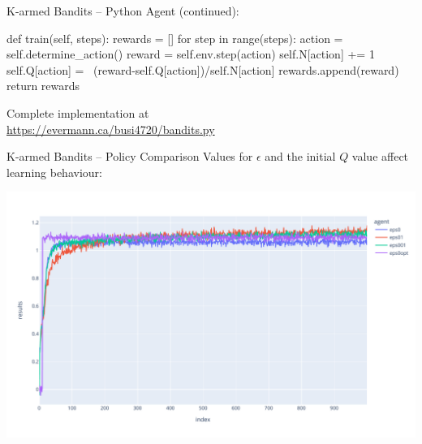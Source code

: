 \documentclass[ignorenonframetext,xcolor=x11names]{beamer}
\begin{document}
\begin{frame}[fragile]{K-armed Bandits -- Python}
Agent (continued):
\begin{pythoncode}
    def train(self, steps):
        rewards = []
        for step in range(steps):
            action = self.determine_action()
            reward = self.env.step(action)
            self.N[action] += 1
            self.Q[action] = \
               (reward-self.Q[action])/self.N[action]
            rewards.append(reward)
        return rewards
\end{pythoncode}
\begin{center}
Complete implementation at \\
\vspace{\baselineskip}
\url{https://evermann.ca/busi4720/bandits.py}
\end{center}
\end{frame}

\begin{frame}{K-armed Bandits -- Policy Comparison}
Values for $\epsilon$ and the initial $Q$ value affect learning behaviour:

\includegraphics[width=\textwidth]{bandits.pdf}
\end{frame}
\end{document}
